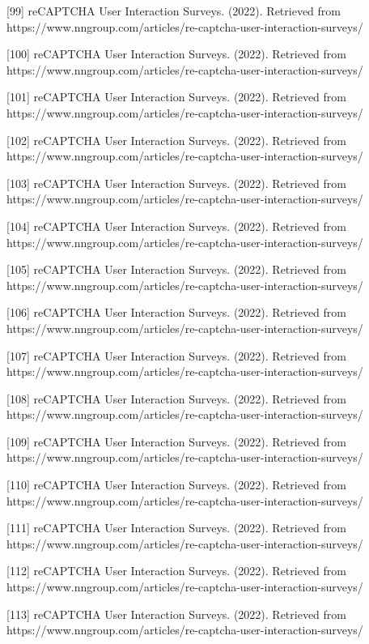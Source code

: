 [99] reCAPTCHA User Interaction Surveys. (2022). Retrieved from https://www.nngroup.com/articles/re-captcha-user-interaction-surveys/ 

[100] reCAPTCHA User Interaction Surveys. (2022). Retrieved from https://www.nngroup.com/articles/re-captcha-user-interaction-surveys/ 

[101] reCAPTCHA User Interaction Surveys. (2022). Retrieved from https://www.nngroup.com/articles/re-captcha-user-interaction-surveys/ 

[102] reCAPTCHA User Interaction Surveys. (2022). Retrieved from https://www.nngroup.com/articles/re-captcha-user-interaction-surveys/ 

[103] reCAPTCHA User Interaction Surveys. (2022). Retrieved from https://www.nngroup.com/articles/re-captcha-user-interaction-surveys/ 

[104] reCAPTCHA User Interaction Surveys. (2022). Retrieved from https://www.nngroup.com/articles/re-captcha-user-interaction-surveys/ 

[105] reCAPTCHA User Interaction Surveys. (2022). Retrieved from https://www.nngroup.com/articles/re-captcha-user-interaction-surveys/ 

[106] reCAPTCHA User Interaction Surveys. (2022). Retrieved from https://www.nngroup.com/articles/re-captcha-user-interaction-surveys/ 

[107] reCAPTCHA User Interaction Surveys. (2022). Retrieved from https://www.nngroup.com/articles/re-captcha-user-interaction-surveys/ 

[108] reCAPTCHA User Interaction Surveys. (2022). Retrieved from https://www.nngroup.com/articles/re-captcha-user-interaction-surveys/ 

[109] reCAPTCHA User Interaction Surveys. (2022). Retrieved from https://www.nngroup.com/articles/re-captcha-user-interaction-surveys/ 

[110] reCAPTCHA User Interaction Surveys. (2022). Retrieved from https://www.nngroup.com/articles/re-captcha-user-interaction-surveys/ 

[111] reCAPTCHA User Interaction Surveys. (2022). Retrieved from https://www.nngroup.com/articles/re-captcha-user-interaction-surveys/ 

[112] reCAPTCHA User Interaction Surveys. (2022). Retrieved from https://www.nngroup.com/articles/re-captcha-user-interaction-surveys/ 

[113] reCAPTCHA User Interaction Surveys. (2022). Retrieved from https://www.nngroup.com/articles/re-captcha-user-interaction-surveys/ 

